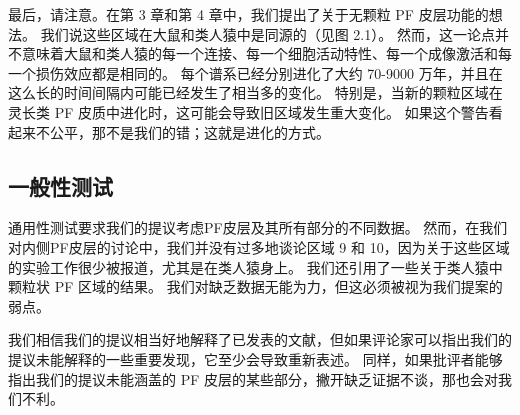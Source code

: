 \par 
最后，请注意。在第 3 章和第 4 章中，我们提出了关于无颗粒 PF 皮层功能的想法。 我们说这些区域在大鼠和类人猿中是同源的（见图 2.1）。 然而，这一论点并不意味着大鼠和类人猿的每一个连接、每一个细胞活动特性、每一个成像激活和每一个损伤效应都是相同的。 每个谱系已经分别进化了大约 70-9000 万年，并且在这么长的时间间隔内可能已经发生了相当多的变化。 特别是，当新的颗粒区域在灵长类 PF 皮质中进化时，这可能会导致旧区域发生重大变化。 如果这个警告看起来不公平，那不是我们的错；这就是进化的方式。
\subsection{一般性测试}
通用性测试要求我们的提议考虑PF皮层及其所有部分的不同数据。 然而，在我们对内侧PF皮层的讨论中，我们并没有过多地谈论区域 9 和 10，因为关于这些区域的实验工作很少被报道，尤其是在类人猿身上。 我们还引用了一些关于类人猿中颗粒状 PF 区域的结果。 我们对缺乏数据无能为力，但这必须被视为我们提案的弱点。
\par 
我们相信我们的提议相当好地解释了已发表的文献，但如果评论家可以指出我们的提议未能解释的一些重要发现，它至少会导致重新表述。 同样，如果批评者能够指出我们的提议未能涵盖的 PF 皮层的某些部分，撇开缺乏证据不谈，那也会对我们不利。